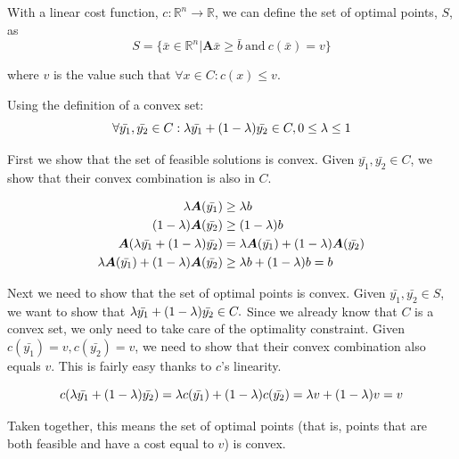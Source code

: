 \documentclass[11pt, a4paper]{article}
\begin{document}
With a linear cost function, $c: \mathbb{R}^n\to\mathbb{R}$,  we can
define the set of optimal points, $S$, as
\begin{equation}
    S=\{\bar{x}\in\mathbb{R}^n | \boldsymbol{A}\bar{x} \geq \bar{b}\ \text{and}\ c(\bar{x})=v\} 
\end{equation}

where $v$ is the value such that $\forall x\in C: c(x) \leq v$.

Using the definition of a convex set:
\begin{equation}
    \forall \bar{y_1}, \bar{y_2} \in C: \lambda \bar{y_1} + (1-\lambda) \bar{y_2} \in C, 0 \leq \lambda \leq 1
\end{equation}

First we show that the set of feasible solutions is convex. Given $\bar{y_1}, \bar{y_2} \in C$, we show that
their convex combination is also in $C$. 

\begin{align}
    \lambda\boldsymbol{A}(\bar{y_1}) &\geq \lambda b\\
    (1-\lambda)\boldsymbol{A}(\bar{y_2}) &\geq (1-\lambda)b\\
    \boldsymbol{A}(\lambda \bar{y_1} + (1-\lambda) \bar{y_2}) &=  \lambda\boldsymbol{A}(\bar{y_1}) +
    (1-\lambda)\boldsymbol{A}(\bar{y_2}) \\
    \lambda\boldsymbol{A}(\bar{y_1}) + (1-\lambda)\boldsymbol{A}(\bar{y_2}) &\geq \lambda b + (1-\lambda)b = b
\end{align}

Next we need to show that the set of optimal points is convex. Given $\bar{y_1}, \bar{y_2} \in S$, we want to
show that $\lambda \bar{y_1} + (1-\lambda) \bar{y_2} \in C.$ Since we already know that $C$ is a convex set, we only
need to take care of the optimality constraint. Given $c(\bar{y_1}) = v, c(\bar{y_2}) = v$, we need to show that
their convex combination also equals $v$. This is fairly easy thanks to $c$'s linearity.

\begin{equation}
    c(\lambda \bar{y_1} + (1-\lambda) \bar{y_2}) = \lambda c(\bar{y_1}) + (1-\lambda) c(\bar{y_2}) = \lambda v + (1-\lambda)v = v
\end{equation}

Taken together, this means the set of optimal points (that is, points that are both feasible and
have a cost equal to $v$) is convex.
\end{document}

